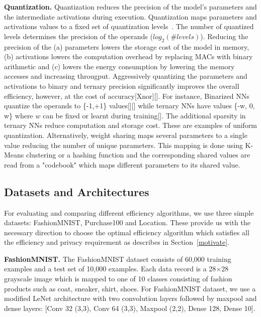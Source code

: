 \noindent\textbf{Quantization.} Quantization reduces the precision of the model's parameters and the intermediate activations during execution.
Quantization maps parameters and activations values to a fixed set of quantization levels~\cite{Hubara:2017:QNN:3122009.3242044}.
The number of quantized levels determines the precision of the operands ($log_2(\#levels)$).
Reducing the precision of the (a) parameters lowers the storage cost of the model in memory, (b) activations lowers the computation overhead by replacing MACs with binary arithmetic and (c) lowers the energy consumption by lowering the memory accesses and increasing througput.
Aggressively quantizing the parameters and activations to binary and ternary precision significantly improves the overall efficiency, however, at the cost of accuracy[Xnor][].
For instance, Binarized NNs quantize the operands to \{-1,+1\} values[][] while ternary NNs have values \{-w, 0, w\} where $w$ can be fixed or learnt during training[].
The additional sparsity in ternary NNs reduce computation and storage cost. These are examples of uniform quantization.
Alternatively, weight sharing maps several parameters to a single value reducing the number of unique parameters.
This mapping is done using K-Means clustering or a hashing function and the corresponding shared values are read from a "codebook" which maps different parameters to its shared value.



\subsection{Datasets and Architectures}


For evaluating and comparing different efficiency algorithms, we use three simple datasets: FashionMNIST, Purchase100 and Location.
These provide us with the necessary direction to choose the optimal efficiency algorithm which satisfies all the efficiency and privacy requirement as describes in Section~\ref{motivate}.

\noindent\textbf{FashionMNIST.} The FashionMNIST dataset consists of 60,000 training examples and a test set of 10,000 examples.
Each data record is a 28$\times$28 grayscale image which is mapped to one of 10 classes consisting of fashion products such as coat, sneaker, shirt, shoes.
For FashionMNIST dataset, we use a modified LeNet architecture with two convolution layers followed by maxpool and dense layers: [Conv 32 (3,3), Conv 64 (3,3), Maxpool (2,2), Dense 128, Dense 10].

